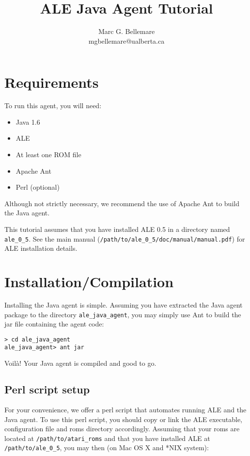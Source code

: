\documentclass[12pt]{article}
\title{ALE Java Agent Tutorial}
\author{Marc G. Bellemare\\ mgbellemare@ualberta.ca}
\begin{document}
\maketitle

\section{Requirements}

To run this agent, you will need:

\begin{itemize}
  \item{Java 1.6}
  \item{ALE}
  \item{At least one ROM file}
  \item{Apache Ant}
  \item{Perl (optional)}
\end{itemize}

Although not strictly necessary, we recommend the use of Apache Ant to build
the Java agent.

This tutorial assumes that you have installed ALE 0.5 in a directory named \verb+ale_0_5+. See
the main manual (\verb+/path/to/ale_0_5/doc/manual/manual.pdf+) for ALE installation details. 

\section{Installation/Compilation}

Installing the Java agent is simple. Assuming you have extracted the Java agent
package to the directory \verb+ale_java_agent+, you may simply use Ant to build the
jar file containing the agent code: 

\begin{verbatim}
> cd ale_java_agent
ale_java_agent> ant jar
\end{verbatim}

Voil\`a! Your Java agent is compiled and good to go.

\subsection{Perl script setup}\label{subsec:perl_script}

For your convenience, we offer a perl script that automates running ALE and
the Java agent. To use this perl script, you should copy or link the ALE 
executable, configuration file and roms directory accordingly. Assuming that
your roms are located at \verb+/path/to/atari_roms+ and that you have 
installed ALE at \verb+/path/to/ale_0_5+, you may then (on Mac OS X and *NIX system): 
\end{document}
